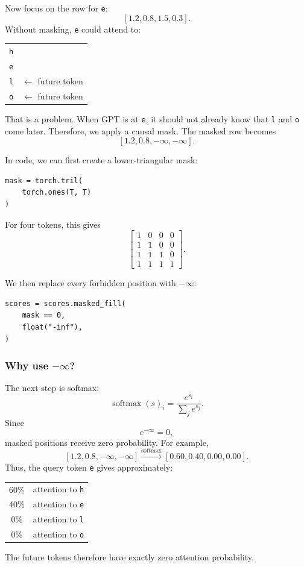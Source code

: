 Now focus on the row for \texttt{e}:
\[
  [1.2,0.8,1.5,0.3].
\]
Without masking, \texttt{e} could attend to:
\begin{center}
\begin{tabular}{@{}ll@{}}
  \texttt{h} & \\
  \texttt{e} & \\
  \texttt{l} & \(\leftarrow\) future token \\
  \texttt{o} & \(\leftarrow\) future token
\end{tabular}
\end{center}

That is a problem. When GPT is at \texttt{e}, it should not already know that
\texttt{l} and \texttt{o} come later. Therefore, we apply a causal mask. The
masked row becomes
\[
  [1.2,0.8,-\infty,-\infty].
\]

In code, we can first create a lower-triangular mask:
\begin{lstlisting}[style=shadedpython]
mask = torch.tril(
    torch.ones(T, T)
)
\end{lstlisting}
For four tokens, this gives
\[
  \begin{bmatrix}
    1 & 0 & 0 & 0 \\
    1 & 1 & 0 & 0 \\
    1 & 1 & 1 & 0 \\
    1 & 1 & 1 & 1
  \end{bmatrix}.
\]

We then replace every forbidden position with \(-\infty\): \\

\begin{lstlisting}[style=shadedpython]
scores = scores.masked_fill(
    mask == 0,
    float("-inf"),
)
\end{lstlisting}

\subsubsection*{Why use \(-\infty\)?}

The next step is softmax:
\[
  \operatorname{softmax}(s)_i
  =\frac{e^{s_i}}{\sum_j e^{s_j}}.
\]
Since
\[
  e^{-\infty}=0,
\]
masked positions receive zero probability. For example,
\[
  [1.2,0.8,-\infty,-\infty]
  \xrightarrow{\operatorname{softmax}}
  [0.60,0.40,0.00,0.00].
\]
Thus, the query token \texttt{e} gives approximately:
\begin{center}
\begin{tabular}{@{}cl@{}}
  60\% & attention to \texttt{h} \\
  40\% & attention to \texttt{e} \\
  0\%  & attention to \texttt{l} \\
  0\%  & attention to \texttt{o}
\end{tabular}
\end{center}
The future tokens therefore have exactly zero attention probability.

